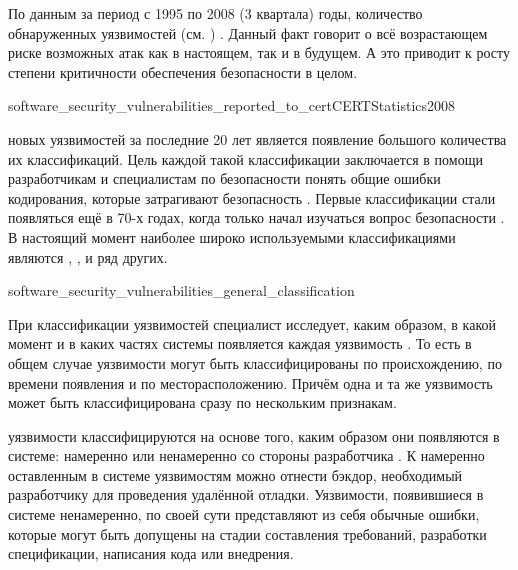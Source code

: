 %
По данным  за период с 1995 по 2008 (3 квартала) годы, количество обнаруженных уязвимостей   (см. ) . 
%
Данный факт говорит о всё возрастающем риске возможных атак как в настоящем, так и в будущем. 
%
А это приводит к росту степени критичности обеспечения безопасности  в целом. 

	{software_security_vulnerabilities_reported_to_cert}{CERTStatistics2008}

%
 новых уязвимостей за последние 20 лет является появление большого количества их классификаций. 
%
Цель каждой такой классификации заключается в помощи разработчикам  и специалистам по безопасности  понять общие ошибки кодирования, которые затрагивают безопасность . 
%
Первые классификации стали появляться ещё в 70-х годах, когда только начал изучаться вопрос безопасности  .  
%
В настоящий момент наиболее широко используемыми классификациями являются  ,  ,   и ряд других.

	{software_security_vulnerabilities_general_classification}

%
При классификации уязвимостей  специалист исследует, каким образом, в какой момент и в каких частях системы появляется каждая уязвимость   . 
%
То есть в общем случае уязвимости могут быть классифицированы по происхождению, по времени появления и по месторасположению. 
%
Причём одна и та же уязвимость может быть классифицирована сразу по нескольким признакам. 

%
 уязвимости классифицируются на основе того, каким образом они появляются в системе: намеренно или ненамеренно со стороны разработчика . 
%
К намеренно оставленным в системе уязвимостям можно отнести бэкдор, необходимый разработчику для проведения удалённой отладки. 
%
Уязвимости, появившиеся в системе ненамеренно, по своей сути представляют из себя обычные ошибки, которые могут быть допущены на стадии составления требований, разработки спецификации, написания кода или внедрения. 

